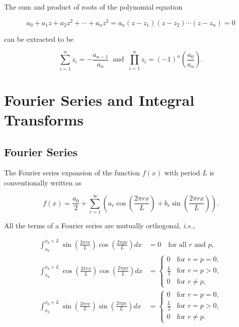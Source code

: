 \documentclass[english,a4paper,12pt]{report}
\begin{document}
The sum and product of roots of the polynomial equation

\begin{equation}
    a_0 + a_1 z + a_2 z ^2 + \cdots + a_{n}z^2 = a_{n}(z - z_1 )(z-z_2 )\cdots (z-z_{n} ) = 0   
\end{equation}

can be extracted to be 

\begin{equation}
    \sum_{i=1}^{n} z_{i} = - \frac{a_{n-1} }{a_{n} } ~\text { and }~ \prod_{i=1}^{n} z_{i} = (-1)^{n} \left(\frac{a_{0} }{a_{n} }\right).     
\end{equation}



\chapter{Fourier Series and Integral Transforms}

\section{Fourier Series}

The Fourier series expansion of the function \(f(x)\) with period \(L\) is conventionally written as 

\begin{equation}
    f(x) = \frac{a_0 }{2} + \sum_{r=1}^{\infty} \left( a_{r} \cos \left( \frac{2\pi rx}{L}  \right) + b_{r} \sin \left( \frac{2\pi rx}{L}  \right)  \right). 
\end{equation}

All the terms of a Fourier series are mutually orthogonal, \textit{i.e.,} 

\begin{equation}
    \begin{aligned}
        \int_{x_0}^{x_0+L} \sin\left(\frac{2\pi r x}{L}\right) \cos\left(\frac{2\pi p x}{L}\right) dx &= 0 \quad \text{for all } r \text{ and } p, \\
        \int_{x_0}^{x_0+L} \cos\left(\frac{2\pi r x}{L}\right) \cos\left(\frac{2\pi p x}{L}\right) dx &=
\begin{cases} 
    0 & \text{for } r = p = 0, \\
    \frac{L}{2} & \text{for } r = p > 0, \\
    0 & \text{for } r \neq p,
\end{cases} \\
\int_{x_0}^{x_0+L} \sin\left(\frac{2\pi r x}{L}\right) \sin\left(\frac{2\pi p x}{L}\right) dx &=
\begin{cases} 
    0 & \text{for } r = p = 0, \\
    \frac{L}{2} & \text{for } r = p > 0, \\
    0 & \text{for } r \neq p.
\end{cases}
    \end{aligned}
\end{equation}
\end{document}
